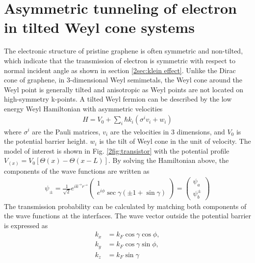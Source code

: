 \section{Asymmetric tunneling of electron in tilted Weyl cone systems} \label{2sec:asymmetric tunneling}
    The electronic structure of pristine graphene is often symmetric and non-tilted, 
    which indicate that the transmission of electron is symmetric with respect to normal incident angle as shown in section \ref{2sec:klein effect}.
    Unlike the Dirac cone of graphene, in 3-dimensional Weyl semimetals, the Weyl cone around the Weyl point is generally tilted and anisotropic as Weyl points are not located on high-symmetry k-points.
    A tilted Weyl fermion can be described by the low energy Weyl Hamiltonian with asymmetric velocities
    \begin{align}\label{2eq:Hamiltonian titled}
        H = V_0 + \sum_{i} \hbar k_i(\sigma^{i} v_i + w_i) 
    \end{align}
    where $\sigma^i$ are the Pauli matrices, $v_i$ are the velocities in 3 dimensions, and $V_0$ is the potential barrier height.
    $w_i$ is the tilt of Weyl cone in the unit of velocity. The model of interest is shown in Fig. \ref{2fig:transistor} with the potential profile $V_{(x)} = V_0[\Theta(x)-\Theta(x-L)]$.
    By solving the Hamiltonian above, the components of the wave functions are written as
    \begin{align} \label{2eq: wave functions}
        \psi_{\pm} = \frac{1}{\sqrt{2}}e^{i k^{\rightarrow} r^{\rightarrow}}
        \begin{pmatrix}
            1 \\
            e^{i \phi} \sec{\gamma (\pm 1 + \sin{\gamma})}
        \end{pmatrix}= 
        \begin{pmatrix}
            \psi_a \\
            \psi_b^{\pm}
        \end{pmatrix}   
    \end{align}
    The transmission probability can be calculated by matching both components of the wave functions at the interfaces.
    The wave vector outside the potential barrier is expressed as
    \begin{equation}\label{2eq:outside wavevector}
        \begin{aligned} 
            k_x &= k_F \cos{\gamma} \cos{\phi},\\
            k_y &= k_F\cos{\gamma} \sin{\phi},\\
            k_z &= k_F \sin{\gamma}\\
        \end{aligned}
    \end{equation}
